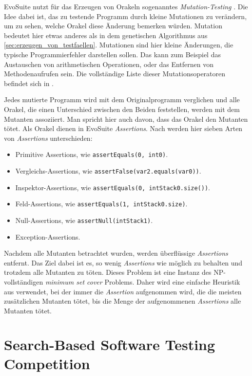 \documentclass[a4paper,11pt]{article}
\begin{document}
EvoSuite nutzt für das Erzeugen von Orakeln sogenanntes \textit{Mutation-Testing} \cite{TSE12_Mutation, emse14_mutation}.
Die Idee dabei ist, das zu testende Programm durch kleine Mutationen zu verändern, um zu sehen, welche Orakel diese Änderung bemerken würden.
Mutation bedeutet hier etwas anderes als in dem genetischen Algorithmus aus \cref{sec:erzeugen_von_testfaellen}.
Mutationen sind hier kleine Änderungen, die typische Programmierfehler darstellen sollen.
Das kann zum Beispiel das Austauschen von arithmetischen Operationen, oder das Entfernen von Methodenaufrufen sein.
Die vollständige Liste dieser Mutationsoperatoren befindet sich in \cite{emse14_mutation}.

Jedes mutierte Programm wird mit dem Originalprogramm verglichen und alle Orakel, die einen Unterschied zwischen den Beiden feststellen, werden mit dem Mutanten assoziiert.
Man spricht hier auch davon, dass das Orakel den Mutanten tötet.
Als Orakel dienen in EvoSuite \textit{Assertions}.
Nach \citep{TSE12_Mutation} werden hier sieben Arten von \textit{Assertions} unterschieden:
\begin{itemize}
	\item Primitive Assertions, wie \lstinline{assertEquals(0, int0)}.
	\item Vergleichs-Assertions, wie \lstinline{assertFalse(var2.equals(var0))}.
	\item Inspektor-Assertions, wie \lstinline{assertEquals(0, intStack0.size())}.
	\item Feld-Assertions, wie \lstinline{assertEquals(1, intStack0.size)}.
	\item Null-Assertions, wie \lstinline{assertNull(intStack1)}.
	\item Exception-Assertions.
\end{itemize}
Nachdem alle Mutanten betrachtet wurden, werden überflüssige \textit{Assertions} entfernt.
Das Ziel dabei ist es, so wenig \textit{Assertions} wie möglich zu behalten und trotzdem alle Mutanten zu töten.
Dieses Problem ist eine Instanz des NP-vollständigen \textit{minimum set cover} Problems.
Daher wird eine einfache Heuristik aus \cite{chvatal1979greedy} verwendet, bei der immer die \textit{Assertion} aufgenommen wird, die die meisten zusätzlichen Mutanten tötet, bis die Menge der aufgenommenen \textit{Assertions} alle Mutanten tötet.

\section{Search-Based Software Testing Competition}
\end{document}
